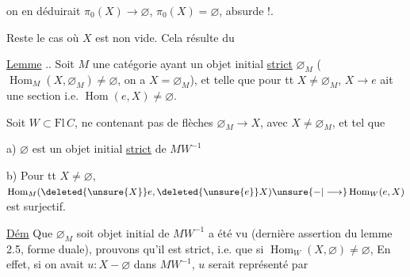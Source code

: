 
on en déduirait $\pi_0(X)\longrightarrow\varnothing$,  $\pi_0(X)=\varnothing$, absurde !.

Reste le cas où $X$ est non vide. Cela résulte du 

\uline{Lemme} .. Soit $M$ une catégorie ayant un objet initial \uline{strict} $\varnothing_M$ ( $\operatorname{Hom}_M(X,\varnothing_M)\ne\varnothing$, on a $X=\varnothing_M$),  et telle que pour tt $X\ne\varnothing_M$, $X\longrightarrow e$ ait une section i.e. $\operatorname{Hom}(e,X)\ne\varnothing$.

 Soit $W\subset\mathrm{Fl}\,C$,   ne contenant pas de flèches $\varnothing_M\longrightarrow X$, avec $X\ne\varnothing_M$, et  tel que


a) $\varnothing$ est un objet initial \uline{strict} de $MW^{-1}$

b) Pour tt $X\ne\varnothing$, $\operatorname{Hom}_M(\deleted{\unsure{X}}e,\deleted{\unsure{e}}X)\unsure{{-}|\longrightarrow}\operatorname{Hom}_W(e,X)$ est surjectif.

\uline{Dém} Que $\varnothing_M$ soit objet initial de $MW^{-1}$ a été vu (dernière assertion du lemme 2.5, forme duale), prouvons qu'il est strict, i.e. que si  $\operatorname{Hom}_W(X,\varnothing)\ne\varnothing$,  En effet,  si on avait $u:X{-}\varnothing$ dans $MW^{-1}$, $u$ serait représenté par

